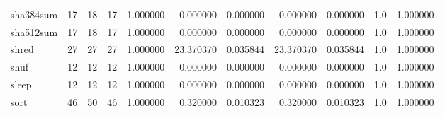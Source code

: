 \begin{tabular}{lrrrrrrrrrr}
sha384sum &                                      17 &                 18 &                                17 &                                   1.000000 &                               0.000000 &                                     0.000000 &                          0.000000 &                                0.000000 &                                1.0 &                                           1.000000 \\
sha512sum &                                      17 &                 18 &                                17 &                                   1.000000 &                               0.000000 &                                     0.000000 &                          0.000000 &                                0.000000 &                                1.0 &                                           1.000000 \\
shred     &                                      27 &                 27 &                                27 &                                   1.000000 &                              23.370370 &                                     0.035844 &                         23.370370 &                                0.035844 &                                1.0 &                                           1.000000 \\
shuf      &                                      12 &                 12 &                                12 &                                   1.000000 &                               0.000000 &                                     0.000000 &                          0.000000 &                                0.000000 &                                1.0 &                                           1.000000 \\
sleep     &                                      12 &                 12 &                                12 &                                   1.000000 &                               0.000000 &                                     0.000000 &                          0.000000 &                                0.000000 &                                1.0 &                                           1.000000 \\
sort      &                                      46 &                 50 &                                46 &                                   1.000000 &                               0.320000 &                                     0.010323 &                          0.320000 &                                0.010323 &                                1.0 &                                           1.000000 \\

\end{tabular}

